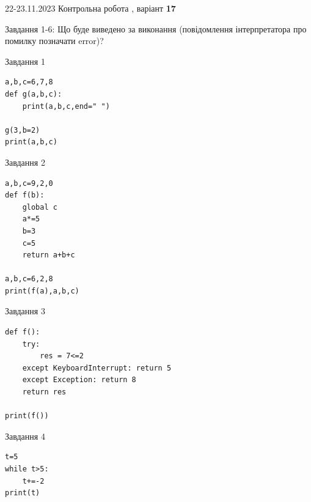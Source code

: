 \documentclass[12pt, ukrainian]{article}
\begin{document}
{{22-23.11.2023 Контрольна робота , варіант  \No \textbf { 17 }\par}}
{

Завдання 1-6: Що буде виведено за виконання (повідомлення інтерпретатора про помилку позначати error)?


\begin{minipage}[t]{9.7cm}                
{\begin{center}Завдання {1}\end{center}}
\begin{verbatim}
a,b,c=6,7,8
def g(a,b,c):
    print(a,b,c,end=" ")

g(3,b=2)
print(a,b,c)
\end{verbatim}     
\end{minipage}
\vline \hspace{8mm}
\begin{minipage}[t]{8.0cm}                
{\begin{center}Завдання {2}\end{center}}
\begin{verbatim}
a,b,c=9,2,0
def f(b):
    global c
    a*=5
    b=3
    c=5
    return a+b+c

a,b,c=6,2,8
print(f(a),a,b,c)
\end{verbatim}     
\end{minipage}

\vspace{15mm}
\begin{minipage}[t]{9.7cm}                
{\begin{center}Завдання {3}\end{center}}
\begin{verbatim}
def f():
    try:
        res = 7<=2
    except KeyboardInterrupt: return 5
    except Exception: return 8
    return res

print(f())
\end{verbatim}     
\end{minipage}
\vline \hspace{8mm}
\begin{minipage}[t]{8.0cm}                
{\begin{center}Завдання {4}\end{center}}
\begin{verbatim}
t=5
while t>5:
    t+=-2
print(t)
\end{verbatim}     
\end{minipage}

}
\end{document}

